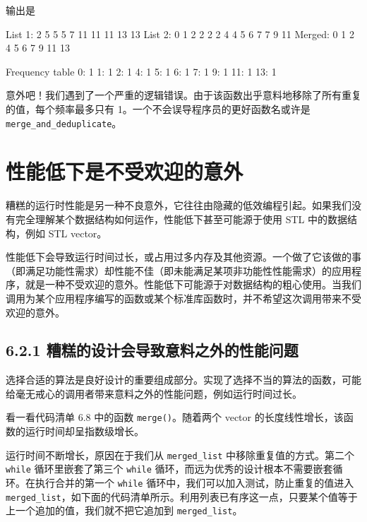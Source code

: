 输出是

\begin{codebox}
List 1: 2 5 5 5 7 11 11 11 13 13
List 2: 0 1 2 2 2 2 4 4 5 6 7 7 9 11
Merged: 0 1 2 4 5 6 7 9 11 13

Frequency table
      0: 1
      1: 1
      2: 1
      4: 1
      5: 1
      6: 1
      7: 1
      9: 1
     11: 1
     13: 1
\end{codebox}

意外吧！我们遇到了一个严重的逻辑错误。由于该函数出乎意料地移除了所有重复的值，每个频率最多只有 1。一个不会误导程序员的更好函数名或许是 \texttt{merge\_\allowbreak{}and\_\allowbreak{}deduplicate}。


\section{性能低下是不受欢迎的意外}

糟糕的运行时性能是另一种不良意外，它往往由隐藏的低效编程引起。如果我们没有完全理解某个数据结构如何运作，性能低下甚至可能源于使用 STL 中的数据结构，例如 STL vector。

性能低下会导致运行时间过长，或占用过多内存及其他资源。一个做了它该做的事（即满足功能性需求）却性能不佳（即未能满足某项非功能性性能需求）的应用程序，就是一种不受欢迎的意外。性能低下可能源于对数据结构的粗心使用。当我们调用为某个应用程序编写的函数或某个标准库函数时，并不希望这次调用带来不受欢迎的意外。

\subsection{6.2.1 糟糕的设计会导致意料之外的性能问题}

选择合适的算法是良好设计的重要组成部分。实现了选择不当的算法的函数，可能给毫无戒心的调用者带来意料之外的性能问题，例如运行时间过长。

看一看代码清单 6.8 中的函数 \texttt{merge()}。随着两个 vector 的长度线性增长，该函数的运行时间却呈指数级增长。

运行时间不断增长，原因在于我们从 \texttt{merged\_\allowbreak{}list} 中移除重复值的方式。第二个 \texttt{while} 循环里嵌套了第三个 \texttt{while} 循环，而远为优秀的设计根本不需要嵌套循环。在执行合并的第一个 \texttt{while} 循环中，我们可以加入测试，防止重复的值进入 \texttt{merged\_\allowbreak{}list}，如下面的代码清单所示。利用列表已有序这一点，只要某个值等于上一个追加的值，我们就不把它追加到 \texttt{merged\_\allowbreak{}list}。

